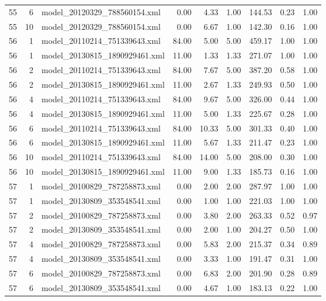 \begin{table}[ht]
\begin{tabular}{rrlrrrrrr}
   55 &   6 & model\_20120329\_788560154.xml & 0.00 & 4.33 & 1.00 & 144.53 & 0.23 & 1.00 \\ 
   55 &  10 & model\_20120329\_788560154.xml & 0.00 & 6.67 & 1.00 & 142.30 & 0.16 & 1.00 \\ 
   56 &   1 & model\_20110214\_751339643.xml & 84.00 & 5.00 & 5.00 & 459.17 & 1.00 & 1.00 \\ 
   56 &   1 & model\_20130815\_1890929461.xml & 11.00 & 1.33 & 1.33 & 271.07 & 1.00 & 1.00 \\ 
   56 &   2 & model\_20110214\_751339643.xml & 84.00 & 7.67 & 5.00 & 387.20 & 0.58 & 1.00 \\ 
   56 &   2 & model\_20130815\_1890929461.xml & 11.00 & 2.67 & 1.33 & 249.93 & 0.50 & 1.00 \\ 
   56 &   4 & model\_20110214\_751339643.xml & 84.00 & 9.67 & 5.00 & 326.00 & 0.44 & 1.00 \\ 
   56 &   4 & model\_20130815\_1890929461.xml & 11.00 & 5.00 & 1.33 & 225.67 & 0.28 & 1.00 \\ 
   56 &   6 & model\_20110214\_751339643.xml & 84.00 & 10.33 & 5.00 & 301.33 & 0.40 & 1.00 \\ 
   56 &   6 & model\_20130815\_1890929461.xml & 11.00 & 5.67 & 1.33 & 211.47 & 0.23 & 1.00 \\ 
   56 &  10 & model\_20110214\_751339643.xml & 84.00 & 14.00 & 5.00 & 208.00 & 0.30 & 1.00 \\ 
   56 &  10 & model\_20130815\_1890929461.xml & 11.00 & 9.00 & 1.33 & 185.73 & 0.16 & 1.00 \\ 
   57 &   1 & model\_20100829\_787258873.xml & 0.00 & 2.00 & 2.00 & 287.97 & 1.00 & 1.00 \\ 
   57 &   1 & model\_20130809\_353548541.xml & 0.00 & 1.00 & 1.00 & 221.03 & 1.00 & 1.00 \\ 
   57 &   2 & model\_20100829\_787258873.xml & 0.00 & 3.80 & 2.00 & 263.33 & 0.52 & 0.97 \\ 
   57 &   2 & model\_20130809\_353548541.xml & 0.00 & 2.00 & 1.00 & 204.27 & 0.50 & 1.00 \\ 
   57 &   4 & model\_20100829\_787258873.xml & 0.00 & 5.83 & 2.00 & 215.37 & 0.34 & 0.89 \\ 
   57 &   4 & model\_20130809\_353548541.xml & 0.00 & 3.33 & 1.00 & 191.47 & 0.31 & 1.00 \\ 
   57 &   6 & model\_20100829\_787258873.xml & 0.00 & 6.83 & 2.00 & 201.90 & 0.28 & 0.89 \\ 
   57 &   6 & model\_20130809\_353548541.xml & 0.00 & 4.67 & 1.00 & 183.13 & 0.22 & 1.00 \\ 

\end{tabular}
\end{table}
